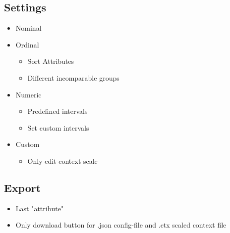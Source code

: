 \documentclass[]{article}
\begin{document}
\subsection{Settings}
\begin{itemize}
	\item Nominal
	\item Ordinal
		\begin{itemize}
			\item Sort Attributes
			\item Different incomparable groups
		\end{itemize}
	\item Numeric
	    \begin{itemize}
	    	\item Predefined intervals
	    	\item Set custom intervals
	    \end{itemize}
    \item Custom
    	\begin{itemize}
    		\item Only edit context scale
    	\end{itemize}
\end{itemize}

\subsection{Export}
	\begin{itemize}
		\item Last "attribute"
		\item Only download button for .json config-file and .ctx scaled context file
	\end{itemize}
\end{document}
